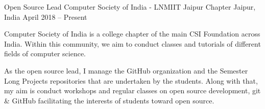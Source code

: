 \begin{cventries}
{\begin{cvitems}
		\end{cvitems}}
  \cventry
	{Open Source Lead}
	{Computer Society of India - LNMIIT Jaipur Chapter}
	{Jaipur, India}
	{April 2018 – Present}
	{\begin{cvitems}
		\item {Computer Society of India is a college chapter of the main CSI Foundation across India. Within this community, we aim to conduct classes and tutorials of different fields of computer science.}
		\item {As the open source lead, I manage the GitHub organization and the Semester Long Projects repositories that are undertaken by the students. Along with that, my aim is conduct workshops and regular classes on open source development, git \& GitHub facilitating the interests of students toward open source.}
		\end{cvitems}}
\end{cventries}
